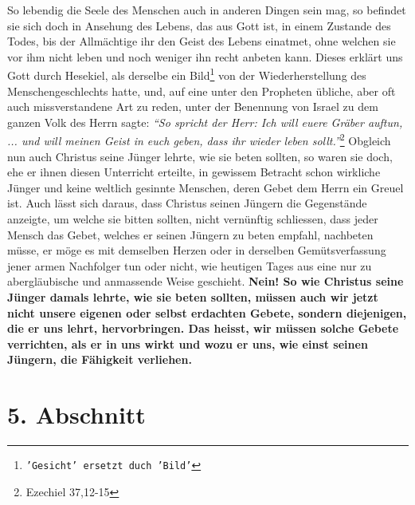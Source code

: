  So lebendig die Seele des Menschen auch in anderen
Dingen sein mag, so befindet
sie sich doch in Ansehung des Lebens, das aus Gott ist, in einem Zustande des
Todes, bis der Allmächtige ihr den Geist des Lebens einatmet, ohne welchen sie
vor ihm nicht leben und noch weniger ihn recht anbeten kann. Dieses erklärt uns
Gott durch Hesekiel, als derselbe ein Bild\footnote{\texttt{'Gesicht' ersetzt
duch
'Bild'}} von der Wiederherstellung des
Menschengeschlechts hatte, und,
auf eine unter den Propheten  übliche, aber oft auch
missverstandene Art zu
reden, unter der Benennung von Israel  zu dem
ganzen Volk des Herrn sagte:
\textit{"`So spricht der Herr: Ich will euere Gräber auftun, ... und will meinen
Geist in
euch geben, dass ihr wieder leben sollt."'}\footnote{Ezechiel 37,12-15}
Obgleich nun auch Christus seine
Jünger lehrte, wie sie beten sollten, so waren sie doch, ehe er ihnen diesen
Unterricht erteilte, in gewissem Betracht schon wirkliche Jünger und keine
weltlich gesinnte Menschen, deren Gebet dem Herrn ein Greuel ist. Auch
lässt sich daraus, dass Christus seinen Jüngern die Gegenstände anzeigte, um
welche sie bitten sollten, nicht
vernünftig schliessen, dass jeder Mensch das Gebet, welches er seinen Jüngern zu
beten empfahl, nachbeten  müsse, er möge es mit
demselben Herzen oder in
derselben Gemütsverfassung jener armen Nachfolger tun oder nicht, wie heutigen
Tages aus eine nur zu abergläubische und anmassende Weise geschieht.
\label{ref:06_04_gebet} \textbf{Nein! So
wie Christus seine Jünger damals lehrte, wie sie beten sollten, müssen auch wir
jetzt nicht unsere eigenen oder selbst erdachten Gebete, sondern diejenigen, die
er uns
lehrt, hervorbringen. Das heisst, wir müssen solche Gebete verrichten, als er
in uns wirkt und wozu er uns, wie einst seinen Jüngern, die Fähigkeit
verliehen.}

\section{5. Abschnitt} \label{kap6_ab5}

